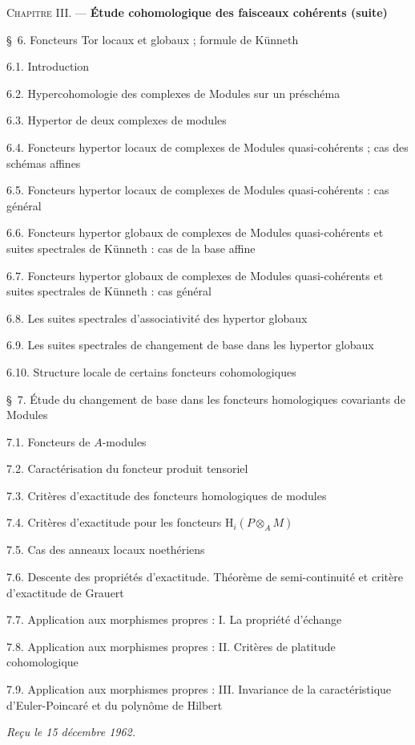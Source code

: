 \begin{flushleft}
\textsc{Chapitre III.} --- \textbf{Étude cohomologique des faisceaux cohérents
(suite)} 

\medskip
\S~6. Foncteurs Tor locaux et globaux ; formule de Künneth 

6.1. Introduction 

6.2. Hypercohomologie des complexes de Modules sur un préschéma 

6.3. Hypertor de deux complexes de modules 

6.4. Foncteurs hypertor locaux de complexes de Modules quasi-cohérents ; cas
des schémas affines 

6.5. Foncteurs hypertor locaux de complexes de Modules quasi-cohérents : cas
général 

6.6. Foncteurs hypertor globaux de complexes de Modules quasi-cohérents et
suites spectrales de Künneth : cas de la base affine 

6.7. Foncteurs hypertor globaux de complexes de Modules quasi-cohérents et
suites spectrales de Künneth : cas général 

6.8. Les suites spectrales d'associativité des hypertor globaux 

6.9. Les suites spectrales de changement de base dans les hypertor globaux

6.10. Structure locale de certains foncteurs cohomologiques 

\medskip
\S~7. Étude du changement de base dans les foncteurs homologiques covariants
de Modules 

7.1. Foncteurs de $A$-modules 

7.2. Caractérisation du foncteur produit tensoriel 

7.3. Critères d'exactitude des foncteurs homologiques de modules 

7.4. Critères d'exactitude pour les foncteurs
$\mathrm H_i(P\otimes_A M)$ 

7.5. Cas des anneaux locaux noethériens 

7.6. Descente des propriétés d'exactitude. Théorème de semi-continuité et
critère d'exactitude de Grauert 

7.7. Application aux morphismes propres : I. La propriété d'échange

7.8. Application aux morphismes propres : II. Critères de platitude
cohomologique 

7.9. Application aux morphismes propres : III. Invariance de la
caractéristique d'Euler-Poincaré et du polynôme de Hilbert 

\begin{flushright}
\emph{Reçu le 15 décembre 1962.}
\end{flushright}
\end{flushleft}

